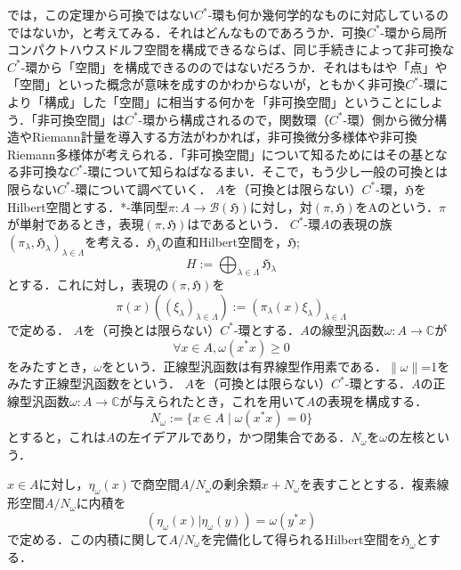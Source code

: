 では，この定理から可換ではない$C^*$-環も何か幾何学的なものに対応しているのではないか，と考えてみる．それはどんなものであろうか．可換$C^*$-環から局所コンパクトハウスドルフ空間を構成できるならば、同じ手続きによって非可換な$C^*$-環から「空間」を構成できるののではないだろうか．それはもはや「点」や「空間」といった概念が意味を成すのかわからないが，ともかく非可換$C^*$-環により「構成」した「空間」に相当する何かを「非可換空間」ということにしよう．「非可換空間」は$C^*$-環から構成されるので，関数環（$C^*$-環）側から微分構造やRiemann計量を導入する方法がわかれば，非可換微分多様体や非可換Riemann多様体が考えられる．「非可換空間」について知るためにはその基となる非可換な$C^*$-環について知らねばなるまい．そこで，もう少し一般の可換とは限らない$C^*$-環について調べていく．
$A$を（可換とは限らない）$C^*$-環，$\mathfrak{H}$をHilbert空間とする．*-準同型$\pi:A\rightarrow \mathcal{B}\left(\mathfrak{H}\right)$に対し，対$\left(\pi,\mathfrak{H}\right)$をAのという．$\pi$が単射であるとき，表現$\left(\pi,\mathfrak{H}\right)$はであるという．
$C^*$-環$A$の表現の族$\left(\pi_{\lambda},\mathfrak{H}_{\lambda}\right)_{\lambda \in \Lambda}$を考える．$\mathfrak{H}_{\lambda}$の直和Hilbert空間を，$\mathfrak{H}$;
\[H:=\bigoplus_{\lambda \in \Lambda}\mathfrak{H}_{\lambda}\]
とする．これに対し，表現の$\left(\pi,\mathfrak{H}\right)$を
\[\pi\left(x\right)\left(\left(\xi_{\lambda}\right)_{\lambda \in \Lambda}\right):=
\left(\pi_{\lambda}\left(x\right)\xi_{\lambda}\right)_{\lambda \in \Lambda}\]
で定める．
$A$を（可換とは限らない）$C^*$-環とする．$A$の線型汎函数$\omega:A\rightarrow \mathbb{C}$が
\[\forall x\in A,\omega(x^*x)\geq0\]
をみたすとき，$\omega$をという．正線型汎函数は有界線型作用素である．$\lVert\omega\rVert$=1をみたす正線型汎函数をという．
$A$を（可換とは限らない）$C^*$-環とする．$A$の正線型汎函数$\omega:A\rightarrow \mathbb{C}$が与えられたとき，これを用いて$A$の表現を構成する．
\[N_{\omega}:=\{x\in A\mid\omega(x^*x)=0 \}\]
とすると，これは$A$の左イデアルであり，かつ閉集合である．$N_{\omega}$を$\omega$の左核という．

$x\in A$に対し，$\eta_{\omega}\left(x\right)$で商空間$A/N_{\omega}$の剰余類$x+N_{\omega}$を表すこととする．複素線形空間$A/N_{\omega}$に内積を
\[\left(\eta_{\omega}(x)|\eta_{\omega}(y)\right)=\omega(y^*x)\]
で定める．この内積に関して$A/N_{\omega}$を完備化して得られるHilbert空間を$\mathfrak{H}_{\omega}$とする．

